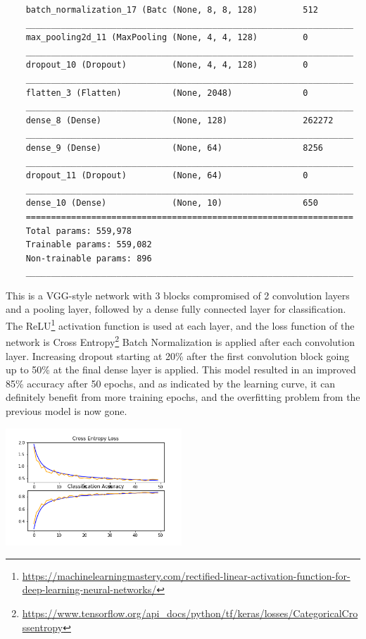 \begin{center}
\begin{verbatim}
    batch_normalization_17 (Batc (None, 8, 8, 128)         512       
    _________________________________________________________________
    max_pooling2d_11 (MaxPooling (None, 4, 4, 128)         0         
    _________________________________________________________________
    dropout_10 (Dropout)         (None, 4, 4, 128)         0         
    _________________________________________________________________
    flatten_3 (Flatten)          (None, 2048)              0         
    _________________________________________________________________
    dense_8 (Dense)              (None, 128)               262272    
    _________________________________________________________________
    dense_9 (Dense)              (None, 64)                8256      
    _________________________________________________________________
    dropout_11 (Dropout)         (None, 64)                0         
    _________________________________________________________________
    dense_10 (Dense)             (None, 10)                650       
    =================================================================
    Total params: 559,978
    Trainable params: 559,082
    Non-trainable params: 896
    _________________________________________________________________
    \end{verbatim}
\end{center}
This is a VGG-style network with 3 blocks compromised of 2 convolution layers and a pooling layer, followed by a dense fully connected layer for classification.
The ReLU\footnote{\href{https://machinelearningmastery.com/rectified-linear-activation-function-for-deep-learning-neural-networks/}{https://machinelearningmastery.com/rectified-linear-activation-function-for-deep-learning-neural-networks/}} activation function is used at each layer, and the loss function of the network is Cross Entropy\footnote{\href{https://www.tensorflow.org/api\_docs/python/tf/keras/losses/CategoricalCrossentropy}{https://www.tensorflow.org/api\_docs/python/tf/keras/losses/CategoricalCrossentropy}}
Batch Normalization is applied after each convolution layer.
Increasing dropout starting at 20\% after the first convolution block going up to 50\% at the final dense layer is applied.
This model resulted in an improved 85\% accuracy after 50 epochs, and as indicated by the learning curve, it can definitely benefit from more training epochs, and the overfitting problem from the previous model is now gone.
\begin{center}
    \captionsetup{type=figure}
    \includegraphics[width=250px]{sections/exp-2/images/improved-plot.png}
\end{center}
